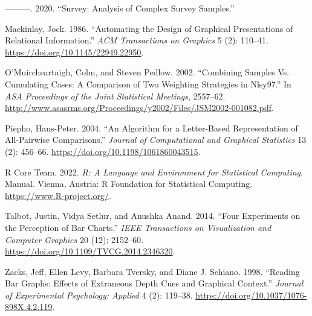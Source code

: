\documentclass[
]{jds}
\newlength{\cslhangindent}
\newlength{\cslentryspacingunit} %
\newenvironment{CSLReferences}[2] %
 {%
  \setlength{\parindent}{0pt}
  \ifodd #1
  \let\oldpar\par
  \def\par{\hangindent=\cslhangindent\oldpar}
  \fi
  \setlength{\parskip}{#2\cslentryspacingunit}
 }%
 {}
\begin{document}
\begin{CSLReferences}{1}{0}
\leavevmode{}%
---------. 2020. {``Survey: Analysis of Complex Survey Samples.''}

\leavevmode{}%
Mackinlay, Jock. 1986. {``Automating the Design of Graphical
Presentations of Relational Information.''} \emph{ACM Transactions on
Graphics} 5 (2): 110--41. \url{https://doi.org/10.1145/22949.22950}.

\leavevmode{}%
O'Muircheartaigh, Colm, and Steven Pedlow. 2002. {``Combining {Samples
Vs}. {Cumulating Cases}: {A Comparison} of {Two Weighting Strategies} in
{Nlsy97}.''} In \emph{{ASA Proceedings} of the {Joint Statistical
Meetings}}, 2557--62.
\url{http://www.asasrms.org/Proceedings/y2002/Files/JSM2002-001082.pdf}.

\leavevmode{}%
Piepho, Hans-Peter. 2004. {``An {Algorithm} for a {Letter-Based
Representation} of {All-Pairwise Comparisons}.''} \emph{Journal of
Computational and Graphical Statistics} 13 (2): 456--66.
\url{https://doi.org/10.1198/1061860043515}.

\leavevmode{}%
R Core Team. 2022. \emph{R: {A} Language and Environment for Statistical
Computing}. Manual. {Vienna, Austria}: {R Foundation for Statistical
Computing}. \url{https://www.R-project.org/}.

\leavevmode{}%
Talbot, Justin, Vidya Setlur, and Anushka Anand. 2014. {``Four
{Experiments} on the {Perception} of {Bar Charts}.''} \emph{IEEE
Transactions on Visualization and Computer Graphics} 20 (12): 2152--60.
\url{https://doi.org/10.1109/TVCG.2014.2346320}.

\leavevmode{}%
Zacks, Jeff, Ellen Levy, Barbara Tversky, and Diane J. Schiano. 1998.
{``Reading Bar Graphs: {Effects} of Extraneous Depth Cues and Graphical
Context.''} \emph{Journal of Experimental Psychology: Applied} 4 (2):
119--38. \url{https://doi.org/10.1037/1076-898X.4.2.119}.

\end{CSLReferences}
\end{document}
